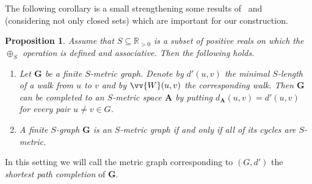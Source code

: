 \documentclass{elsarticle}
\def\str#1{\mathbf {#1}}
\theoremstyle{plain}
\newtheorem{prop}[theorem]{Proposition}
\theoremstyle{definition}
\theoremstyle{remark}
\begin{document}
The following corollary is a small strengthening some results of~\cite{Sauer2013} and~\cite{Sauer2013b} (considering not only closed sets) which are important for our construction.
\begin{prop}
\label{prop:sauer1}
Assume that $S\subseteq \mathbb R_{>0}$ is a subset of positive reals on which the $\oplus_S$ operation is defined and associative.
Then the following holds.
\begin{enumerate}
\item \label{cor:suaer1:1} Let $\str{G}$ be a finite $S$-metric graph.
Denote by $d'(u,v)$ the minimal $S$-length of a walk from $u$ to $v$ and by
$\vv{W}(u,v)$ the corresponding walk.
Then $\str{G}$ can be completed to an $S$-metric space $\str{A}$ by putting $d_\str{A}(u,v)=d'(u,v)$ for every pair $u\neq v\in G$.
\item \label{cor:suaer1:2} A finite $S$-graph $\str{G}$ is an $S$-metric graph if and only if all of its cycles are $S$-metric.
\end{enumerate}
\end{prop}
In this setting we will call the metric graph corresponding to $(G,d')$ the \emph{shortest path completion} of $\str{G}$.
\end{document}

